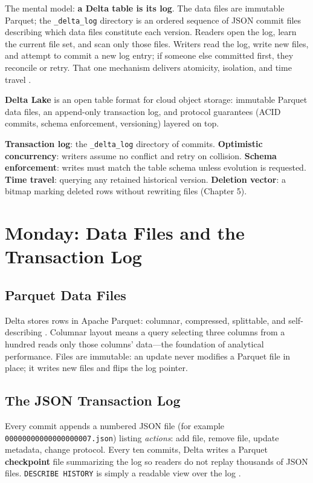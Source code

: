 The mental model: \textbf{a Delta table is its log}. The data files are immutable Parquet; the \texttt{\_delta\_log} directory is an ordered sequence of JSON commit files describing which data files constitute each version. Readers open the log, learn the current file set, and scan only those files. Writers read the log, write new files, and attempt to commit a new log entry; if someone else committed first, they reconcile or retry. That one mechanism delivers atomicity, isolation, and time travel \cite{deltaLakeDocs}.

\begin{definitionbox}
\textbf{Delta Lake} is an open table format for cloud object storage: immutable Parquet data files, an append-only transaction log, and protocol guarantees (ACID commits, schema enforcement, versioning) layered on top.
\end{definitionbox}

\begin{keyterms}
\textbf{Transaction log}: the \texttt{\_delta\_log} directory of commits. \textbf{Optimistic concurrency}: writers assume no conflict and retry on collision. \textbf{Schema enforcement}: writes must match the table schema unless evolution is requested. \textbf{Time travel}: querying any retained historical version. \textbf{Deletion vector}: a bitmap marking deleted rows without rewriting files (Chapter 5).
\end{keyterms}

\section{Monday: Data Files and the Transaction Log}
\subsection{Parquet Data Files}
Delta stores rows in Apache Parquet: columnar, compressed, splittable, and self-describing \cite{apacheParquet}. Columnar layout means a query selecting three columns from a hundred reads only those columns' data---the foundation of analytical performance. Files are immutable: an update never modifies a Parquet file in place; it writes new files and flips the log pointer.

\subsection{The JSON Transaction Log}
Every commit appends a numbered JSON file (for example \texttt{00000000000000000007.json}) listing \emph{actions}: add file, remove file, update metadata, change protocol. Every ten commits, Delta writes a Parquet \textbf{checkpoint} file summarizing the log so readers do not replay thousands of JSON files. \texttt{DESCRIBE HISTORY} is simply a readable view over the log \cite{databricksDelta}.

